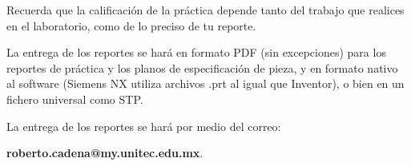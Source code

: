 	Recuerda que la calificación de la práctica depende tanto del trabajo que realices en el laboratorio, como de lo preciso de tu reporte.

	La entrega de los reportes se hará en formato PDF (sin excepciones) para los reportes de práctica y los planos de especificación de pieza, y en formato nativo al software (Siemens NX utiliza archivos .prt al igual que Inventor), o bien en un fichero universal como STP.

	La entrega de los reportes se hará por medio del correo:

	\begin{center}
		\textbf{roberto.cadena@my.unitec.edu.mx}. \\
	\end{center}

\begin{center}
	\huge \textthing
\end{center}



